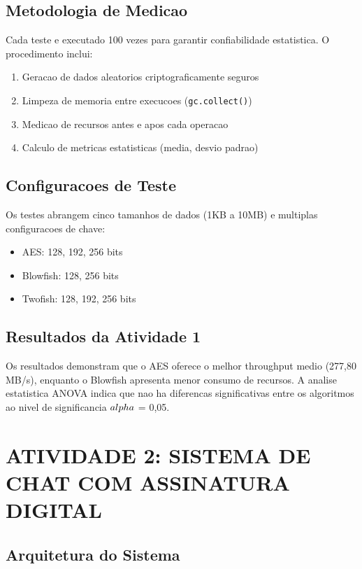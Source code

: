 \documentclass[12pt,a4paper,oneside]{article}
\begin{document}
\subsection{Metodologia de Medicao}

Cada teste e executado 100 vezes para garantir confiabilidade estatistica. O procedimento inclui:

\begin{enumerate}
    \item Geracao de dados aleatorios criptograficamente seguros
    \item Limpeza de memoria entre execucoes (\texttt{gc.collect()})
    \item Medicao de recursos antes e apos cada operacao
    \item Calculo de metricas estatisticas (media, desvio padrao)
\end{enumerate}

\subsection{Configuracoes de Teste}

Os testes abrangem cinco tamanhos de dados (1KB a 10MB) e multiplas configuracoes de chave:
\begin{itemize}
    \item AES: 128, 192, 256 bits
    \item Blowfish: 128, 256 bits
    \item Twofish: 128, 192, 256 bits
\end{itemize}

\subsection{Resultados da Atividade 1}

Os resultados demonstram que o AES oferece o melhor throughput medio (277,80 MB/s), enquanto o Blowfish apresenta menor consumo de recursos. A analise estatistica ANOVA indica que nao ha diferencas significativas entre os algoritmos ao nivel de significancia $\\alpha$ = 0,05.

\section{ATIVIDADE 2: SISTEMA DE CHAT COM ASSINATURA DIGITAL}

\subsection{Arquitetura do Sistema}
\end{document}
